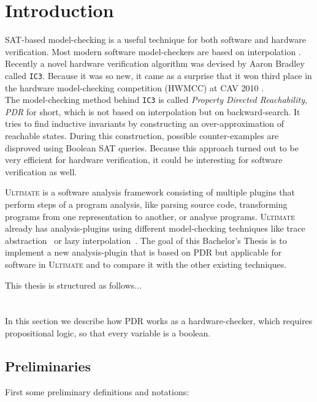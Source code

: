 \documentclass[11pt, a4paper, BCOR=10mm, ngerman]{scrbook}
\begin{document}
\chapter{Introduction}
SAT-based model-checking is a useful technique for both software and hardware verification. Most modern software model-checkers are based on interpolation \cite{DBLP:conf/cav/VizelG14}. 
Recently a novel hardware verification algorithm was devised by Aaron Bradley \cite{DBLP:conf/vmcai/Bradley11} called \texttt{IC3}.
Because it was so new, it came as a surprise that it won third place in the hardware
model-checking competition (HWMCC) at CAV 2010 \cite{cav}. \\ The model-checking method behind \texttt{IC3} is called \textsl{Property Directed Reachability}, \textsl{PDR} for short, which is not based on interpolation but on backward-search. It tries to find inductive invariants by constructing an over-approximation of reachable states. During this construction, possible counter-examples are disproved using Boolean SAT queries. Because this approach turned out to be very efficient for hardware verification, it could be interesting for software verification as well. \\ \par
\textsc{\textsc{Ultimate}} \cite{Zitat02} is a software analysis framework consisting of multiple plugins that perform steps of a program analysis, like parsing source code, transforming programs from one representation to another, or analyse programs.
 \textsc{\textsc{Ultimate}} already has analysis-plugins using different model-checking techniques like trace abstraction~\cite{DBLP:conf/cav/HeizmannHP13} or lazy interpolation~\cite{DBLP:conf/popl/HenzingerJMS02}.
The goal of this Bachelor's Thesis is to implement a new analysis-plugin that is based on PDR but applicable for software in \textsc{\textsc{Ultimate}} and to compare it with the other existing techniques. \par

This thesis is structured as follows...


\chapter{}
\label{PDR}
In this section we describe how PDR works as a hardware-checker, which requires propositional logic, so that every variable is a boolean.



\section{Preliminaries} \vspace{-5mm}
First some preliminary definitions and notations:  \par
\end{document}
